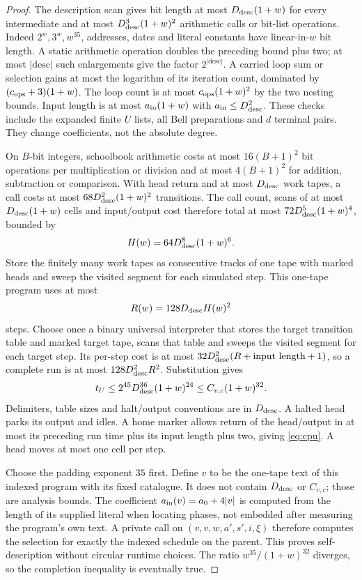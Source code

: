\begin{proof}
The description scan gives bit length at most $D_{\rm desc}(1+w)$ for every intermediate and at most $D_{\rm desc}^3(1+w)^2$ arithmetic calls or bit-list operations. Indeed $2^w,3^w,w^{35}$, addresses, dates and literal constants have linear-in-$w$ bit length. A static arithmetic operation doubles the preceding bound plus two; at most $|\mathrm{desc}|$ such enlargements give the factor $2^{|\mathrm{desc}|}$. A carried loop sum or selection gains at most the logarithm of its iteration count, dominated by $(c_{\rm ops}+3)(1+w)$. The loop count is at most $c_{\rm ops}(1+w)^2$ by the two nesting bounds. Input length is at most $a_{\rm in}(1+w)$ with $a_{\rm in}\le D_{\rm desc}^2$. These checks include the expanded finite $U$ lists, all Bell preparations and $d$ terminal pairs. They change coefficients, not the absolute degree.

On $B$-bit integers, schoolbook arithmetic costs at most $16(B+1)^2$ bit operations per multiplication or division and at most $4(B+1)^2$ for addition, subtraction or comparison. With head return and at most $D_{\rm desc}$ work tapes, a call costs at most $68D_{\rm desc}^2(1+w)^2$ transitions. The call count, scans of at most $D_{\rm desc}(1+w)$ cells and input/output cost therefore total at most $72D_{\rm desc}^5(1+w)^4$, bounded by
\[
 H(w)=64D_{\rm desc}^8(1+w)^6.
\]
Store the finitely many work tapes as consecutive tracks of one tape with marked heads and sweep the visited segment for each simulated step. This one-tape program uses at most
\[
 R(w)=128D_{\rm desc}H(w)^2
\]
steps. Choose once a binary universal interpreter that stores the target transition table and marked target tape, scans that table and sweeps the visited segment for each target step. Its per-step cost is at most $32D_{\rm desc}^2(R+\text{input length}+1)$, so a complete run is at most $128D_{\rm desc}^2R^2$. Substitution gives
\[
 t_U\le2^{45}D_{\rm desc}^{36}(1+w)^{24}
 \le C_{v,c}(1+w)^{32}.
\]
Delimiters, table sizes and halt/output conventions are in $D_{\rm desc}$. A halted head parks its output and idles. A home marker allows return of the head/output in at most its preceding run time plus its input length plus two, giving \eqref{eq:cpu}. A head moves at most one cell per step.

Choose the padding exponent $35$ first. Define $v$ to be the one-tape text of this indexed program with its fixed catalogue. It does not contain $D_{\rm desc}$ or $C_{v,c}$; those are analysis bounds. The coefficient $a_{\rm in}(v)=a_0+4|v|$ is computed from the length of its supplied literal when locating phases, not embedded after measuring the program's own text. A private call on $(v,v,w,a',s',i,\xi)$ therefore computes the selection for exactly the indexed schedule on the parent. This proves self-description without circular runtime choices. The ratio $w^{35}/(1+w)^{32}$ diverges, so the completion inequality is eventually true.


\end{proof}
